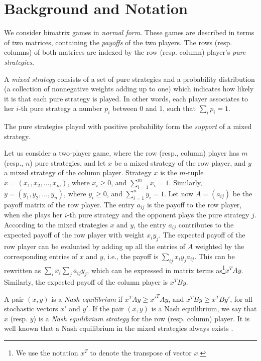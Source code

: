 \documentclass[11pt]{article}
\begin{document}
\section{Background and Notation}

We consider bimatrix games in {\em normal form}. These games are
described in terms of two matrices, containing the {\em payoffs} of
the two players. The rows (resp. columns) of both matrices are
indexed by the row (resp. column) player's {\em pure strategies}.

A {\em mixed strategy} consists of a set of pure strategies and a
probability distribution (a collection of nonnegative weights adding
up to one) which indicates how likely it is that each pure strategy
is played. In other words, each player associates to her $i$-th pure
strategy a number $p_i$ between $0$ and $1$, such that $\sum_i p_i
=1$.

The pure strategies played with positive probability form the {\em
support} of a mixed strategy.

Let us consider a two-player game, where the row (resp., column)
player has $m$ (resp., $n$) pure strategies, and let $x$ be a mixed
strategy of the row player, and $y$ a mixed strategy of the column
player. Strategy $x$ is the $m$-tuple $x = (x_1, x_2, \dots, x_m)$,
where $x_i \geq 0$, and $\sum_{i=1}^m x_i = 1$. Similarly, $y =
(y_1, y_2, \dots, y_n)$, where $y_i \geq 0$, and $\sum_{i=1}^n y_i =
1$. Let now $A=(a_{ij})$ be the payoff matrix of the row player. The
entry $a_{ij}$ is the payoff to the row player, when she plays her
$i$-th pure strategy and the opponent plays the pure strategy $j$.
According to the mixed strategies $x$ and $y$, the entry $a_{ij}$
contributes to the expected payoff of the row player with weight
$x_iy_j$. The expected payoff of the row player can be evaluated by
adding up all the entries of $A$ weighted by the corresponding
entries of $x$ and $y$, i.e., the payoff is $\sum_{ij} x_iy_j
a_{ij}$. This can be rewritten as
 $\sum_{i} x_i \sum_j a_{ij} y_j$, which can be expressed in matrix
terms as\footnote{We
 use the notation $x^T$ to denote the transpose of
vector $x$.}$x^TAy$. Similarly, the expected payoff of the column
player is $x^TBy$.

A pair $(x, y)$ is a {\em Nash equilibrium} if $x^TAy \geq
{x'}^TAy$, and $x^TBy \geq x^TBy'$, for all stochastic vectors $x'$
and $y'$. If the pair $(x, y)$ is a Nash equilibrium, we say that
$x$ (resp. $y$) is a {\em Nash equilibrium strategy} for the row
(resp. column) player. It is well known that a Nash equilibrium in
the mixed strategies always exists \cite{nash}.
\end{document}
